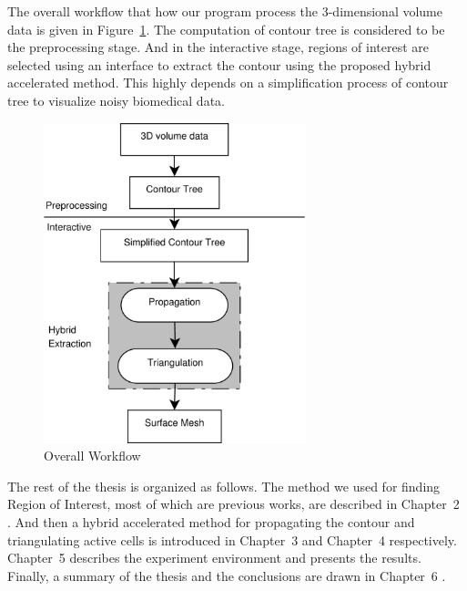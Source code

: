 \documentclass[11pt, b5paper]{report}
\begin{document}


The overall workflow that how our program process the 3-dimensional 
volume data is given in Figure~\ref{fig:workflow}.
The computation of contour tree is considered to be the preprocessing stage. 
And in the interactive stage, regions of interest are selected using
an interface to extract the contour using the proposed hybrid 
accelerated method. This highly depends on a simplification process of contour
tree to visualize noisy biomedical data.

\begin{figure}[h!]%
\centering
\includegraphics[width=3in]{images/workflow.pdf}
\caption{Overall Workflow}
\label{fig:workflow}
\end{figure}

The rest of the thesis is organized as follows. The method we used for
finding Region of Interest, most of which are previous works, 
are described in Chapter~2%
. 
And then a hybrid accelerated method for propagating the contour and 
triangulating active cells is introduced in Chapter~3 %
and Chapter~4 
respectively. Chapter~5 %
describes the 
experiment environment and presents the results. 
Finally, a summary of the thesis and the conclusions are drawn in 
Chapter~6 %
.
\end{document}
